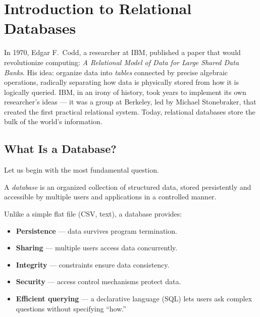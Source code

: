 \chapter{Introduction to Relational Databases}
\label{ch:introduction}

In 1970, Edgar F.\ Codd, a researcher at IBM, published a paper that would
revolutionize computing: \emph{A Relational Model of Data for Large Shared
Data Banks}. His idea: organize data into \emph{tables} connected by precise
algebraic operations, radically separating how data is physically stored
from how it is logically queried. IBM, in an irony of history, took years to
implement its own researcher's ideas --- it was a group at Berkeley, led by
Michael Stonebraker, that created the first practical relational system.
Today, relational databases store the bulk of the world's information.

\section{What Is a Database?}

Let us begin with the most fundamental question.

\begin{definition}[Database]
A \emph{database} is an organized collection of structured data, stored
persistently and accessible by multiple users and applications in a
controlled manner.
\end{definition}

Unlike a simple flat file (CSV, text), a database provides:
\begin{itemize}
    \item \textbf{Persistence} --- data survives program termination.
    \item \textbf{Sharing} --- multiple users access data concurrently.
    \item \textbf{Integrity} --- constraints ensure data consistency.
    \item \textbf{Security} --- access control mechanisms protect data.
    \item \textbf{Efficient querying} --- a declarative language (SQL) lets users
          ask complex questions without specifying ``how.''
\end{itemize}


